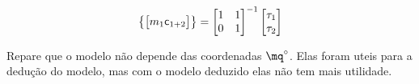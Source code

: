 \begin{itemize}
\begin{itemize}
\begin{equation}
\begin{Bmatrix}
\begin{bmatrix}
		m_1  \mathsf{c}_{1+2}\\
		\end{bmatrix}
	\end{Bmatrix}
	=
	\begin{bmatrix}
	1 & 1 \\
	0 & 1 \\
	\end{bmatrix}^{-1}
	\begin{bmatrix}
	\tau_{1} \\
	\tau_{2} \\
	\end{bmatrix}
	\end{equation}
	
	Repare que o modelo não depende das coordenadas $\mq^\circ$. Elas foram uteis para a dedu\c{c}\~ao do modelo, mas com o modelo deduzido elas não tem mais utilidade.
	
	
	
	
	\end{itemize}
\end{itemize}

